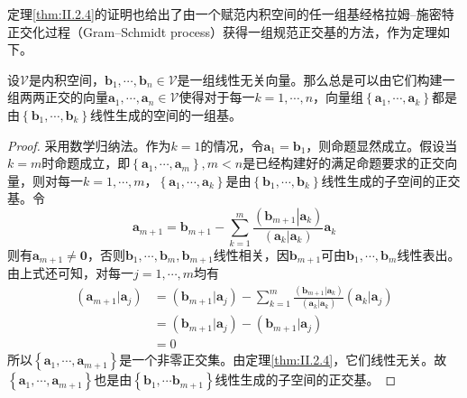 \documentclass[../main.tex]{subfiles}
\begin{document}
定理\ref{thm:II.2.4}的证明也给出了由一个赋范内积空间的任一组基经格拉姆--施密特正交化过程（Gram--Schmidt process）获得一组规范正交基的方法，作为定理如下。

\begin{theorem}\label{thm:II.2.5}
    设$\mathcal{V}$是内积空间，$\mathbf{b}_1,\cdots,\mathbf{b}_n\in\mathcal{V}$是一组线性无关向量。那么总是可以由它们构建一组两两正交的向量$\mathbf{a}_1,\cdots,\mathbf{a}_n\in\mathcal{V}$使得对于每一$k=1,\cdots,n$，向量组$\left\{\mathbf{a}_1,\cdots,\mathbf{a}_k\right\}$都是由$\left\{\mathbf{b}_1,\cdots,\mathbf{b}_k\right\}$线性生成的空间的一组基。
\end{theorem}
\begin{proof}
    采用数学归纳法。作为$k=1$的情况，令$\mathbf{a}_1=\mathbf{b}_1$，则命题显然成立。假设当$k=m$时命题成立，即$\left\{\mathbf{a}_1,\cdots,\mathbf{a}_m\right\},m<n$是已经构建好的满足命题要求的正交向量，则对每一$k=1,\cdots,m$，$\left\{\mathbf{a}_1,\cdots,\mathbf{a}_k\right\}$是由$\left\{\mathbf{b}_1,\cdots,\mathbf{b}_k\right\}$线性生成的子空间的正交基。令
    \[
        \mathbf{a}_{m+1}=\mathbf{b}_{m+1}-\sum_{k=1}^m\frac{\left(\left.\mathbf{b}_{m+1}\right|\left.\mathbf{a}_k\right.\right)}{\left(\mathbf{a}_k|\mathbf{a}_k\right)}\mathbf{a}_k
    \]
    则有$\mathbf{a}_{m+1}\neq\mathbf{0}$，否则$\mathbf{b}_1,\cdots,\mathbf{b}_m,\mathbf{b}_{m+1}$线性相关，因$\mathbf{b}_{m+1}$可由$\mathbf{b}_1,\cdots,\mathbf{b}_m$线性表出。由上式还可知，对每一$j=1,\cdots,m$均有
    \begin{align*}
        \left(\mathbf{a}_{m+1}|\mathbf{a}_j\right) & =\left(\mathbf{b}_{m+1}|\mathbf{a}_j\right)-\sum_{k=1}^m\frac{\left(\mathbf{b}_{m+1}|\mathbf{a}_k\right)}{\left(\mathbf{a}_k|\mathbf{a}_k\right)}\left(\mathbf{a}_k|\mathbf{a}_j\right) \\
                                                   & =\left(\mathbf{b}_{m+1}|\mathbf{a}_j\right)-\left(\mathbf{b}_{m+1}|\mathbf{a}_j\right)                                                                                                  \\
                                                   & =0
    \end{align*}
    所以$\left\{\mathbf{a}_1,\cdots,\mathbf{a}_{m+1}\right\}$是一个非零正交集。由定理\ref{thm:II.2.4}，它们线性无关。故$\left\{\mathbf{a}_1,\cdots,\mathbf{a}_{m+1}\right\}$也是由$\left\{\mathbf{b}_1,\cdots\mathbf{b}_{m+1}\right\}$线性生成的子空间的正交基。
\end{proof}
\end{document}
